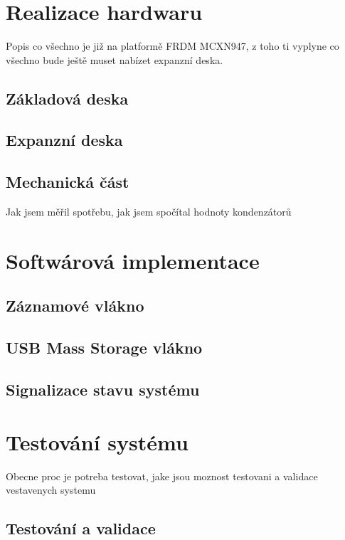 
\chapter{Realizace hardwaru}
Popis co všechno je již na platformě FRDM MCXN947, z toho ti vyplyne co všechno bude ještě muset nabízet expanzní deska.
\section{Základová deska}
\section{Expanzní deska}

\section{Mechanická část}
Jak jsem měřil spotřebu, jak jsem spočítal hodnoty kondenzátorů

\chapter{Softwárová implementace}

\section{Záznamové vlákno}

\section{USB Mass Storage vlákno}

\section{Signalizace stavu systému}

\chapter{Testování systému}
Obecne proc je potreba testovat, jake jsou moznost testovani a validace vestavenych systemu


\section{Testování a validace}

